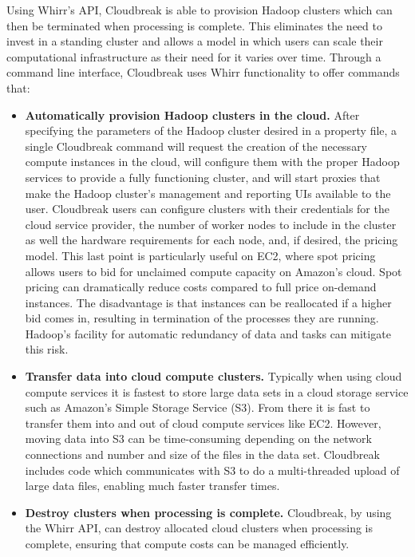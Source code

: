 Using Whirr's API, Cloudbreak is able to provision Hadoop clusters which can then be terminated when processing is complete. This eliminates the need to invest in a standing cluster and allows a model in which users can scale their computational infrastructure as their need for it varies over time. Through a command line interface, Cloudbreak uses Whirr functionality to offer commands that:

\begin{itemize}
\item \textbf{Automatically provision Hadoop clusters in the cloud.} After specifying the parameters of the Hadoop cluster desired in a property file, a single Cloudbreak command will request the creation of the necessary compute instances in the cloud, will configure them with the proper Hadoop services to provide a fully functioning cluster, and will start proxies that make the Hadoop cluster's management and reporting UIs available to the user. Cloudbreak users can configure clusters with their credentials for the cloud service provider, the number of worker nodes to include in the cluster as well the hardware requirements for each node, and, if desired, the pricing model. This last point is particularly useful on EC2, where spot pricing allows users to bid for unclaimed compute capacity on Amazon's cloud. Spot pricing can dramatically reduce costs compared to full price on-demand instances. The disadvantage is that instances can be reallocated if a higher bid comes in, resulting in termination of the processes they are running. Hadoop's facility for automatic redundancy of data and tasks can mitigate this risk.

\item \textbf{Transfer data into cloud compute clusters.} Typically when using cloud compute services it is fastest to store large data sets in a cloud storage service such as Amazon's Simple Storage Service (S3). From there it is fast to transfer them into and out of cloud compute services like EC2. However, moving data into S3 can be time-consuming depending on the network connections and number and size of the files in the data set. Cloudbreak includes code which communicates with S3 to do a multi-threaded upload of large data files, enabling much faster transfer times.

\item \textbf{Destroy clusters when processing is complete.} Cloudbreak, by using the Whirr API, can destroy allocated cloud clusters when processing is complete, ensuring that compute costs can be managed efficiently.
\end{itemize}

